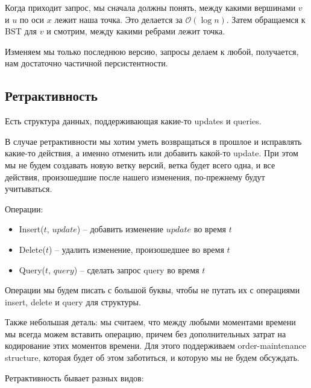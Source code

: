 Когда приходит запрос, мы сначала должны понять, между какими вершинами $v$ и $u$ по оси $x$ лежит наша точка. 
Это делается за $\mathcal{O}(\log n)$.
Затем обращаемся к BST для $v$ и смотрим, между какими ребрами лежит точка.

Изменяем мы только последнюю версию, запросы делаем к любой, получается, нам достаточно частичной персистентности.

\subsection{Ретрактивность}

Есть структура данных, поддерживающая какие-то updates и queries.

В случае ретрактивности мы хотим уметь возвращаться в прошлое и исправлять какие-то действия, а именно отменить или добавить какой-то update.
При этом мы не будем создавать новую ветку версий, ветка будет всего одна, и все действия, произошедшие после нашего изменения, по-прежнему будут учитываться.

Операции:

\begin{itemize}

\item Insert($t$, $update$) -- добавить изменение $update$ во время $t$
\item Delete($t$) -- удалить изменение, произошедшее во время $t$
\item Query($t$, $query$) -- сделать запрос query во время $t$

\end{itemize}

Операции мы будем писать с большой буквы, чтобы не путать их с операциями insert, delete и query для структуры.

Также небольшая деталь: мы считаем, что между любыми моментами времени мы всегда можем вставить операцию, причем без дополнительных затрат на кодирование этих моментов времени.
Для этого поддерживаем order-maintenance structure, которая будет об этом заботиться, и которую мы не будем обсуждать.

Ретрактивность бывает разных видов:

